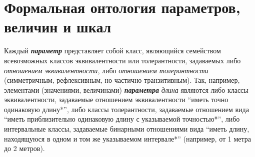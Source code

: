 \section{Формальная онтология параметров, величин и шкал}
\begin{SCn}
	
\begin{scnsubdividing}
\end{scnsubdividing}
\end{SCn}
Каждый \textbf{\textit{параметр}} представляет собой класс, являющийся семейством всевозможных классов эквивалентности или толерантности, задаваемых либо \textit{отношением эквивалентности}, либо \textit{отношением толерантности} (симметричным, рефлексивным, но частично транзитивным). Так, например, элементами (значениями, величинами) \textbf{\textit{параметра}} \textit{длина} являются либо классы эквивалентности, задаваемые отношением эквивалентности ``иметь точно одинаковую длину*'', либо классы толерантности, задаваемые отношением вида ``иметь приблизительно одинаковую длину с указываемой точностью*'', либо интервальные классы, задаваемые бинарными отношениями вида ``иметь длину, находящуюся в одном и том же указываемом интервале*'' (например, от 1 метра до 2 метров).

